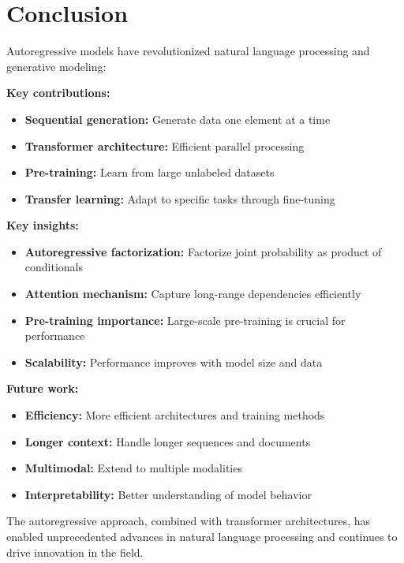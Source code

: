 \section{Conclusion}

Autoregressive models have revolutionized natural language processing and generative modeling:

\textbf{Key contributions:}
\begin{itemize}
    \item \textbf{Sequential generation:} Generate data one element at a time
    \item \textbf{Transformer architecture:} Efficient parallel processing
    \item \textbf{Pre-training:} Learn from large unlabeled datasets
    \item \textbf{Transfer learning:} Adapt to specific tasks through fine-tuning
\end{itemize}

\textbf{Key insights:}
\begin{itemize}
    \item \textbf{Autoregressive factorization:} Factorize joint probability as product of conditionals
    \item \textbf{Attention mechanism:} Capture long-range dependencies efficiently
    \item \textbf{Pre-training importance:} Large-scale pre-training is crucial for performance
    \item \textbf{Scalability:} Performance improves with model size and data
\end{itemize}

\textbf{Future work:}
\begin{itemize}
    \item \textbf{Efficiency:} More efficient architectures and training methods
    \item \textbf{Longer context:} Handle longer sequences and documents
    \item \textbf{Multimodal:} Extend to multiple modalities
    \item \textbf{Interpretability:} Better understanding of model behavior
\end{itemize}

The autoregressive approach, combined with transformer architectures, has enabled unprecedented advances in natural language processing and continues to drive innovation in the field.
